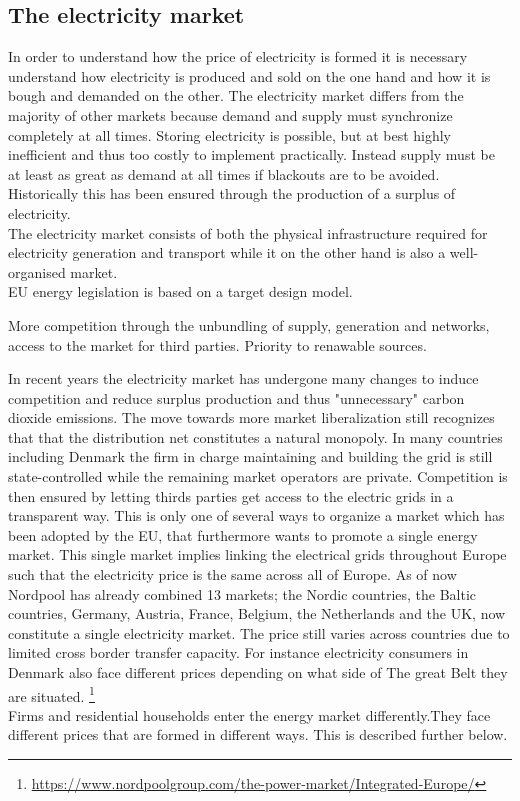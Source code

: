 \label{sec:theory}

\subsection{The electricity market}
\label{subsec:t_market}
In order to understand how the price of electricity is formed it is necessary understand how electricity is produced and sold on the one hand and how it is bough and demanded on the other. The electricity market differs from the majority of other markets because demand and supply must synchronize completely at all times. Storing electricity is possible, but at best highly inefficient and thus too costly to implement practically. Instead supply must be at least as great as demand at all times if blackouts are to be avoided. Historically this has been ensured through the production of a surplus of electricity. \smallskip\\
The electricity market consists of both the physical infrastructure required for electricity generation and transport while it on the other hand is also a well-organised market.  
\smallskip\\
EU energy legislation is based on a target design model. 

More competition through the unbundling of supply, generation and networks, access to the market for third parties. Priority to renawable sources. 

In recent years the electricity market has undergone many changes to induce competition and reduce surplus production and thus "unnecessary" carbon dioxide emissions. The move towards more market liberalization still recognizes that that the distribution net constitutes a natural monopoly. In many countries including Denmark the firm in charge maintaining and building the grid is still state-controlled while the remaining market operators are private. Competition is then ensured by letting thirds parties get access to the electric grids in a transparent way. This is only one of several ways to organize a market which has been adopted by the EU, that furthermore wants to promote a single energy market. This single market  implies linking the electrical grids throughout Europe such that the electricity price is the same across all of Europe. As of now Nordpool has already combined 13 markets; the Nordic countries, the Baltic countries, Germany, Austria, France, Belgium, the Netherlands and the UK, now constitute a single electricity market. The price still varies across countries due to limited cross border transfer capacity. For instance electricity consumers in Denmark also face different prices depending on what side of The great Belt they are situated. \footnote{\url{https://www.nordpoolgroup.com/the-power-market/Integrated-Europe/}} \smallskip \\
Firms and residential households enter the energy market differently.They face different prices that are formed in different ways. This is described further below.  

